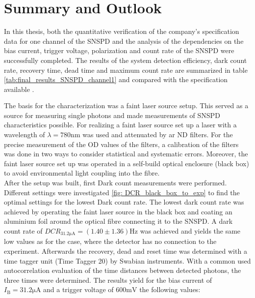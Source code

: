 
\chapter{Summary and Outlook}
\label{sec:Summary_and_Outlook}

In this thesis, both the quantitative verification of the company's specification data for one channel of the SNSPD
and the analysis of the dependencies on the bias current, trigger voltage, polarization and count rate of the SNSPD
were successfully completed.
The results of the system detection efficiency, dark count rate, recovery time,  dead time and maximum count rate are summarized in table \ref{tab:final_results_SNSPD_channel1}
and compared with the specification available \cite{tech_sheet_single_quantum}.

The basis for the characterization was a faint laser source setup.
This served as a source for measuring single photons and made measurements of SNSPD
characteristics possible.
For realizing a faint laser source set up a laser with a wavelength of $\lambda = 780\si{\nano \m}$ was used and
attenuated by ar ND filters.
For the precise measurement of the OD values of the filters, a calibration of the filters was done in two ways to consider statistical and systematic errors.
Moreover, the faint laser source set up was operated in a self-build optical enclosure (black box) to avoid
environmental light coupling into the fibre.\\

After the setup was built, first Dark count measurements were performed.
Different settings were investigated \ref{fig: DCR_black_box_to_exp} to find the optimal settings for the lowest Dark count rate.
The lowest dark count rate was achieved by operating the faint laser source in the black box and coating an aluminium
foil around the optical fibre connecting it to the SNSPD.
A dark count rate of $DCR_{31.2\si{\micro \A}} = (1.40 \pm 1.36) \si{\Hz}$ was achieved and yields the same low values as for
the case, where the detector has no connection to the experiment.
Afterwards the recovery, dead and reset time was determined with a time tagger unit (Time Tagger 20) by Swabian instruments.
With a common used autocorrelation evaluation \cite{autebert-2020,miki-2017} of the time distances between detected photons,
the three times were determined.
The results yield for the bias current of $I_{\text{B}} = 31.2\si{\micro \A}$ and
a trigger voltage of 600$\si{\milli \V}$ the following values:


